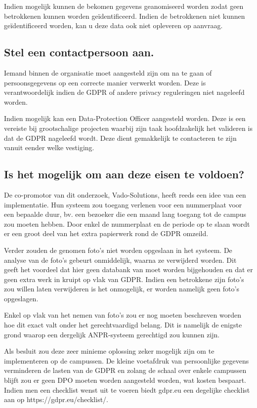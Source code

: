 Indien mogelijk kunnen de bekomen gegevens geanomiseerd worden zodat geen betrokkenen kunnen worden geïdentificeerd. Indien de betrokkenen niet kunnen geïdentificeerd worden, kan u deze data ook niet opleveren op aanvraag.

\subsection{Stel een contactpersoon aan.}
Iemand binnen de organisatie moet aangesteld zijn om na te gaan of persoonsgegevens op een correcte manier verwerkt worden. Deze is verantwoordelijk indien de GDPR of andere privacy reguleringen niet nageleefd worden.

Indien mogelijk kan een Data-Protection Officer aangesteld worden. Deze is een vereiste bij grootschalige projecten waarbij zijn taak hoofdzakelijk het valideren is dat de GDPR nageleefd wordt. Deze dient gemakkelijk te contacteren te zijn vanuit eender welke vestiging.

\subsection{Is het mogelijk om aan deze eisen te voldoen?}
De co-promotor van dit onderzoek, Vado-Solutions, heeft reeds een idee van een implementatie. Hun systeem zou toegang verlenen voor een nummerplaat voor een bepaalde duur, bv. een bezoeker die een maand lang toegang tot de campus zou moeten hebben. Door enkel de nummerplaat en de periode op te slaan wordt er een groot deel van het extra papierwerk rond de GDPR omzeild.

Verder zouden de genomen foto's niet worden opgeslaan in het systeem. De analyse van de foto's gebeurt onmiddelijk, waarna ze verwijderd worden. Dit geeft het voordeel dat hier geen databank van moet worden bijgehouden en dat er geen extra werk in kruipt op vlak van GDPR. Indien een betrokkene zijn foto's zou willen laten verwijderen is het onmogelijk, er worden namelijk geen foto's opgeslagen.

Enkel op vlak van het nemen van foto's zou er nog moeten beschreven worden hoe dit exact valt onder het gerechtvaardigd belang. Dit is namelijk de enigste grond waarop een dergelijk ANPR-systeem gerechtigd zou kunnen zijn.

Als besluit zou deze zeer minieme oplossing zeker mogelijk zijn om te implementeren op de campussen. De kleine voetafdruk van persoonlijke gegevens verminderen de lasten van de GDPR en zolang de schaal over enkele campussen blijft zou er geen DPO moeten worden aangesteld worden, wat kosten bespaart. Indien men een checklist wenst uit te voeren biedt gdpr.eu een degelijke checklist aan op https://gdpr.eu/checklist/.


